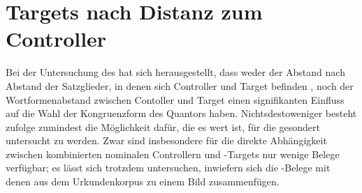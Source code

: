 
\section{Targets nach Distanz zum Controller}
\label{sec:kctargdist}

Bei der Untersuchung des \CAO{} hat sich herausgestellt, dass weder
der  Abstand nach Abstand der Satzglieder, in denen sich
Controller und Target befinden%
, noch der Wortformen\-abstand
zwischen Contoller und Target einen signifikanten Einfluss auf die Wahl der
Kongruenzform des Quantors haben. Nichtsdestoweniger besteht
\citet{corbett1979} zufolge zumindest die Möglichkeit dafür, die es wert ist,
für die \KC{} gesondert untersucht zu werden. Zwar sind insbesondere
für die direkte Abhängigkeit zwischen kombinierten nominalen Controllern und
-Targets nur wenige Belege verfügbar; es lässt sich trotzdem
unter\-suchen, inwiefern sich die \KC{}-Belege mit denen aus dem
Urkundenkorpus zu einem Bild zusammenfügen.




